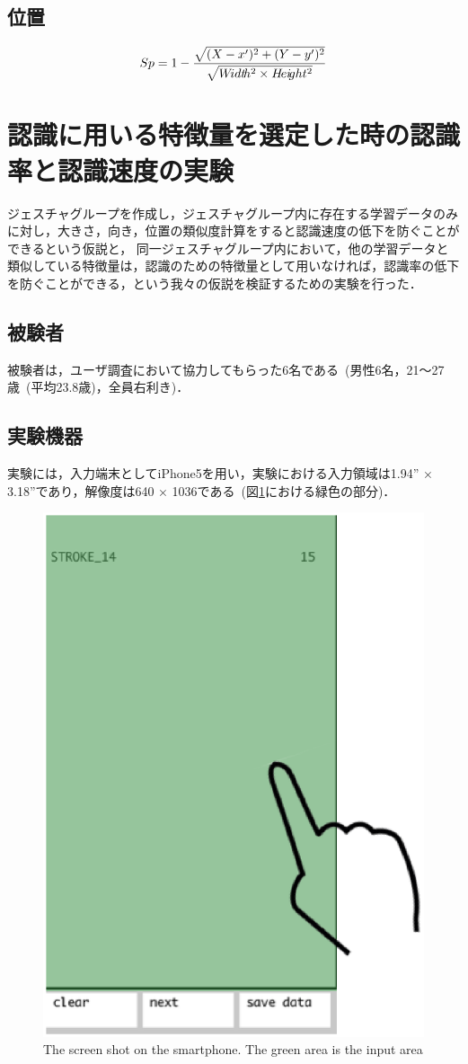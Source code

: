 

\subsection{位置}
\begin{equation}
S{\scriptsize p} = 1 - \frac{\sqrt{(X - x')^2 + (Y - y')^2}}{\sqrt{W\!idt\!h^2 \times H\!ei\!ght^2}}
\end{equation}


\section{認識に用いる特徴量を選定した時の認識率と認識速度の実験}
ジェスチャグループを作成し，ジェスチャグループ内に存在する学習データのみに対し，大きさ，向き，位置の類似度計算をすると認識速度の低下を防ぐことができるという仮説と，
同一ジェスチャグループ内において，他の学習データと類似している特徴量は，認識のための特徴量として用いなければ，認識率の低下を防ぐことができる，という我々の仮説を検証するための実験を行った．

\subsection{被験者}
被験者は，ユーザ調査において協力してもらった6名である~(男性6名，21〜27歳~(平均23.8歳)，全員右利き)．

\subsection{実験機器}
実験には，入力端末としてiPhone5を用い，実験における入力領域は1.94'' × 3.18''であり，解像度は640 × 1036である~(図\ref{fig:screenshot}における緑色の部分)．

\begin{figure}[!h]
\centering
\includegraphics[width=0.4\columnwidth]{img/screenshot.eps}
\caption{The screen shot on the smartphone. The green area is the input area}
\label{fig:screenshot}
\end{figure}


